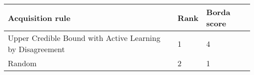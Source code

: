 \begin{tabular}{lll}
Acquisition rule & Rank & Borda score \\ 
\hline 
Upper Credible Bound with Active Learning by Disagreement & 1 & 4 \\ 
Random                                                    & 2 & 1 \\ 
\hline 
\end{tabular}